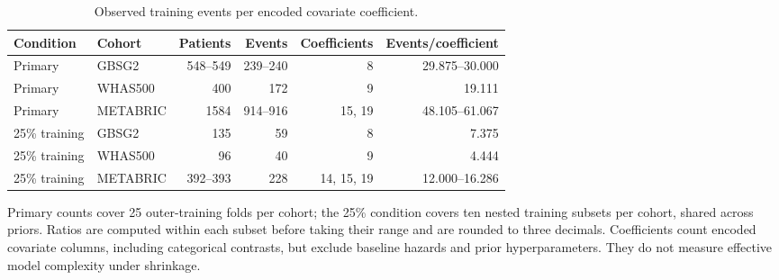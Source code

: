 \begin{table}[htbp]\centering\begingroup\singlespacing\small
\setlength{\tabcolsep}{5pt}
\caption{Observed training events per encoded covariate coefficient.}\label{tab:training-information}
\begin{tabular}{@{}llrrrr@{}}\toprule
Condition & Cohort & Patients & Events & Coefficients & Events/coefficient\\\midrule
Primary & GBSG2 & 548--549 & 239--240 & 8 & 29.875--30.000\\
Primary & WHAS500 & 400 & 172 & 9 & 19.111\\
Primary & METABRIC & 1584 & 914--916 & 15, 19 & 48.105--61.067\\
\midrule
25\% training & GBSG2 & 135 & 59 & 8 & 7.375\\
25\% training & WHAS500 & 96 & 40 & 9 & 4.444\\
25\% training & METABRIC & 392--393 & 228 & 14, 15, 19 & 12.000--16.286\\
\bottomrule\end{tabular}
\par\smallskip\begin{minipage}{\textwidth}
Primary counts cover 25 outer-training folds per cohort; the 25\% condition covers ten nested training subsets per cohort, shared across priors. Ratios are computed within each subset before taking their range and are rounded to three decimals. Coefficients count encoded covariate columns, including categorical contrasts, but exclude baseline hazards and prior hyperparameters. They do not measure effective model complexity under shrinkage.
\end{minipage}\endgroup\end{table}
